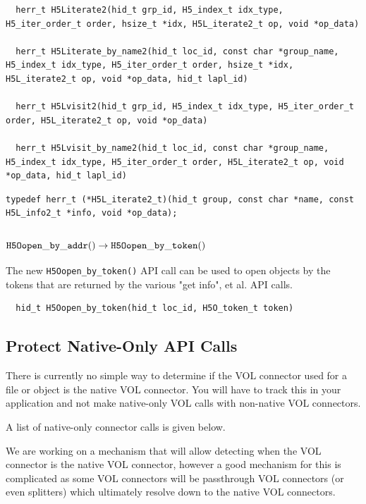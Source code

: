 \begin{lstlisting}
  herr_t H5Literate2(hid_t grp_id, H5_index_t idx_type, H5_iter_order_t order, hsize_t *idx, H5L_iterate2_t op, void *op_data)

  herr_t H5Literate_by_name2(hid_t loc_id, const char *group_name, H5_index_t idx_type, H5_iter_order_t order, hsize_t *idx, H5L_iterate2_t op, void *op_data, hid_t lapl_id)

  herr_t H5Lvisit2(hid_t grp_id, H5_index_t idx_type, H5_iter_order_t order, H5L_iterate2_t op, void *op_data)

  herr_t H5Lvisit_by_name2(hid_t loc_id, const char *group_name, H5_index_t idx_type, H5_iter_order_t order, H5L_iterate2_t op, void *op_data, hid_t lapl_id)
\end{lstlisting}

\begin{lstlisting}
typedef herr_t (*H5L_iterate2_t)(hid_t group, const char *name, const H5L_info2_t *info, void *op_data); 
\end{lstlisting}


\subsubsection{${\tt H5Oopen\_by\_addr()} \rightarrow {\tt H5Oopen\_by\_token()}$}

The new {\tt H5Oopen\_by\_token()} API call can be used to open objects by the tokens that are returned by the various "get info", et al. API calls.

\begin{lstlisting}
  hid_t H5Oopen_by_token(hid_t loc_id, H5O_token_t token)
\end{lstlisting}


\subsection{Protect Native-Only API Calls}

There is currently no simple way to determine if the VOL connector used for a file or object is the native VOL connector. You will have to track this in your application and not make native-only VOL calls with non-native VOL connectors.

A list of native-only connector calls is given below.

We are working on a mechanism that will allow detecting when the VOL connector is the native VOL connector, however a good mechanism for this is complicated as some VOL connectors will be passthrough VOL connectors (or even splitters) which ultimately resolve down to the native VOL connectors.

